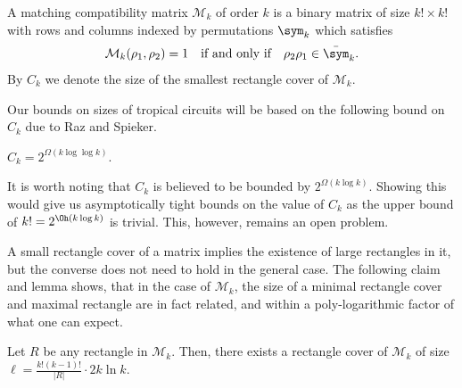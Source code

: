 \begin{definition}
    A matching compatibility matrix $\mathcal{M}_k$ of order $k$ is a binary matrix of size $k! \times k!$ with rows and columns indexed by permutations $\sym_k$ which satisfies
    $$
        \mathcal{M}_k(\rho_1, \rho_2) = 1 \quad \text{if and only if} \quad
        \rho_2 \rho_1 \in \bar\sym_k.
    $$
    By $C_k$ we denote the size of the smallest rectangle cover of $\mathcal{M}_k$.
\end{definition}

Our bounds on sizes of tropical circuits will be based on the following bound on $C_k$ due to Raz and Spieker.
\begin{lemma}\label{lem:raz_spieker}
    $C_k = 2^{\Omega(k \log \log k)}$.
\end{lemma}
It is worth noting that $C_k$ is believed to be bounded by $2^{\Omega(k \log k)}$. Showing this would give us asymptotically tight bounds on the value of $C_k$ as the upper bound of $k! = 2^{\Oh(k \log k)}$ is trivial. This, however, remains an open problem.

A small rectangle cover of a matrix implies the existence of large rectangles in it, but the converse does not need to hold in the general case. The following claim and lemma shows, that in the case of $\mathcal{M}_k$, the size of a minimal rectangle cover and maximal rectangle are in fact related, and within a poly-logarithmic factor of what one can expect.

\begin{claim}\label{clm:mm_rect_cover_duality}
    Let $R$ be any rectangle in $\mathcal{M}_k$. Then, there exists a rectangle cover of $\mathcal{M}_k$ of size $\ell = \frac{k!(k - 1)!}{|R|} \cdot 2k \ln k$.
\end{claim}

